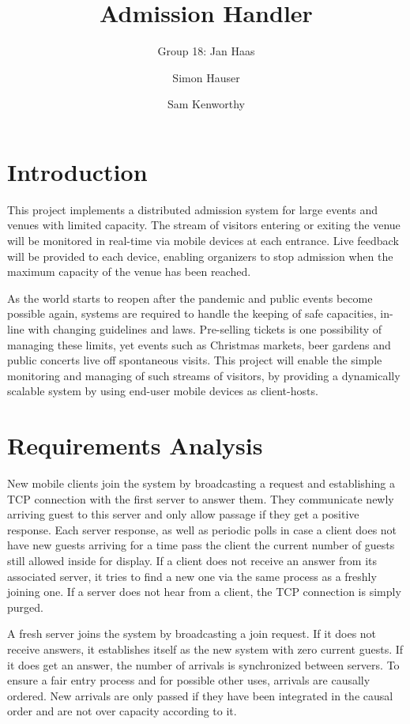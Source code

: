 \documentclass[runningheads]{llncs}
\begin{document}
%
\title{Admission Handler}

\author{Group 18: Jan Haas \and Simon Hauser \and Sam Kenworthy}

\institute{}
%
\maketitle              %

\section{Introduction}
This project implements a distributed admission system for large events and venues with limited capacity.
The stream of visitors entering or exiting the venue will be monitored in real-time via mobile devices at each entrance.
Live feedback will be provided to each device, enabling organizers to stop admission when the maximum capacity of the venue has been reached.

As the world starts to reopen after the pandemic and public events become possible again, systems are required to handle the keeping of safe capacities, in-line with changing guidelines and laws.
Pre-selling tickets is one possibility of managing these limits, yet events such as Christmas markets, beer gardens and public concerts live off spontaneous visits.
This project will enable the simple monitoring and managing of such streams of visitors, by providing a dynamically scalable system by using end-user mobile devices as client-hosts.
\section{Requirements Analysis}
New mobile clients join the system by broadcasting a request and establishing a TCP connection with the first server to answer them.
They communicate newly arriving guest to this server and only allow passage if they get a positive response.
Each server response, as well as periodic polls in case a client does not have new guests arriving for a time pass the client the current number of guests still allowed inside for display.
If a client does not receive an answer from its associated server, it tries to find a new one via the same process as a freshly joining one. If a server does not hear from a client, the TCP connection is simply purged.

A fresh server joins the system by broadcasting a join request.
If it does not receive answers, it establishes itself as the new system with zero current guests.
If it does get an answer, the number of arrivals is synchronized between servers.
To ensure a fair entry process and for possible other uses, arrivals are causally ordered.
New arrivals are only passed if they have been integrated in the causal order and are not over capacity according to it.
\end{document}
